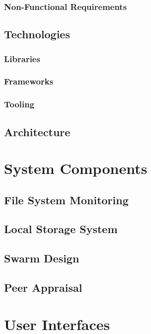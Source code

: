 \documentclass[a4paper, 11pt, twocolumn, twoside]{report}
\begin{document}
\subsection{Non-Functional Requirements}

\section{Technologies}

\subsection{Libraries}

\subsection{Frameworks}

\subsection{Tooling}

\section{Architecture}

\chapter{System Components}

\section{File System Monitoring}

\section{Local Storage System}

\section{Swarm Design}

\section{Peer Appraisal}

\chapter{User Interfaces}
\end{document}
